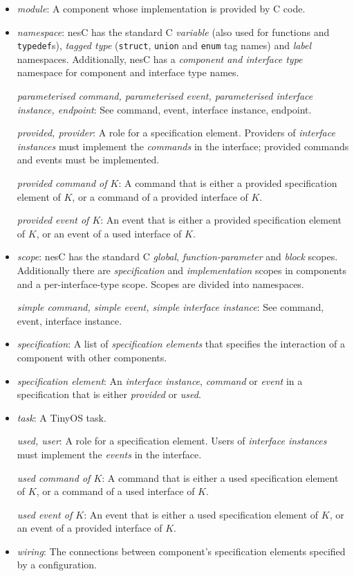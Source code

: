 \documentclass[11pt]{article}
\newcommand{\code}[1]{{\tt #1}}
\newcommand{\nesc}{nesC\xspace}
\begin{document}
\begin{itemize}
\item \emph{module}: A component whose implementation is provided by C
code. 

\item \emph{namespace}: \nesc has the standard C \emph{variable} (also
used for functions and \code{typedef}s), \emph{tagged type} (\code{struct},
\code{union} and \code{enum} tag names) and \emph{label}
namespaces. Additionally, \nesc has a \emph{component and interface type}
namespace for component and interface type names.

\emph{parameterised command, parameterised event, parameterised interface
instance, endpoint}: See command, event, interface instance, endpoint.

\emph{provided, provider}: A role for a specification element. Providers of
\emph{interface instances} must implement the \emph{commands} in the
interface; provided commands and events must be implemented.

\emph{provided command of $K$}: A command that is either a
provided specification element of $K$, or a command of a provided interface
of $K$.

\emph{provided event of $K$}: An event that is either a
provided specification element of $K$, or an event of a used interface
of $K$.

\item \emph{scope}: \nesc has the standard C \emph{global},
\emph{function-parameter} and \emph{block} scopes. Additionally there are
\emph{specification} and \emph{implementation} scopes in components and a
per-interface-type scope. Scopes are divided into namespaces.

\emph{simple command, simple event, simple interface instance}: See
command, event, interface instance.

\item \emph{specification}: A list of \emph{specification elements} that
specifies the interaction of a component with other components.

\item \emph{specification element}: An \emph{interface instance},
\emph{command} or \emph{event} in a specification that is either 
\emph{provided} or \emph{used}.

\item \emph{task}: A TinyOS task.

\emph{used, user}: A role for a specification element. Users of
\emph{interface instances} must implement the \emph{events} in the
interface.

\emph{used command of $K$}: A command that is either a used specification
element of $K$, or a command of a used interface of $K$.

\emph{used event of $K$}: An event that is either a used specification
element of $K$, or an event of a provided interface of $K$.

\item \emph{wiring}: The connections between component's specification
elements specified by a configuration.

\end{itemize}
\end{document}
